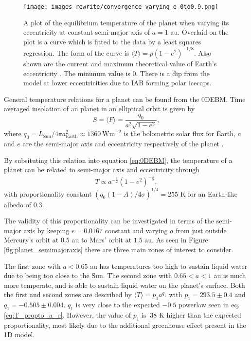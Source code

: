 \documentclass[12pt, onecolumn]{revtex4-2}    %
\begin{document}
\begin{figure}[t]
  \texttt{[image: images\_rewrite/convergence\_varying\_e\_0to0.9.png]}
  \caption{
    A plot of the equilibrium temperature of the planet when varying its eccentricity at constant semi-major axis of $a = 1$ au.
    Overlaid on the plot is a curve which is fitted to the data by a least squares regression.
    The form of the curve is $\langle T \rangle = p(1-e^2)^{-1/8}$.
    Also shown are the current and maximum theoretical value of Earth's eccentricity \cite{LA2010}.
    The minimum value is $0$.
    There is a dip from the model at lower eccentricities due to IAB forming polar icecaps.
  }
  \label{fig:planet_eccentricity}
\end{figure}

General temperature relations for a planet can be found from the 0DEBM.
Time averaged insolation of an planet in an elliptical orbit is given by
\begin{equation}
  S = \langle F \rangle = \frac{q_0}{a^2 \sqrt{1-e^2}},
  \label{eq:avgInsolation}
\end{equation}
where $q_0 = L_{\text{Sun}}/4\pi a_{\text{Earth}}^2 \approx 1360 \ \text{Wm}^{-2}$ is the bolometric solar flux for Earth, $a$ and $e$ are the semi-major axis and eccentricity respectively of the planet \cite{Mendez2017}.

By subsituting this relation into equation \eqref{eq:0DEBM}, the temperature of a planet can be related to semi-major axis and eccentricity through
\begin{equation}
  T \propto a^{-\frac{1}{2}} (1-e^2)^{-\frac{1}{8}}, 
  \label{eq:T_propto_a_e}
\end{equation}
with proportionality constant $(q_0 (1-A) / 4\sigma)^{1/4} = 255$ K for an Earth-like albedo of 0.3.


The validity of this proportionality can be investigated in terms of the semi-major axis by keeping $e = 0.0167$ constant and varying $a$ from just outside Mercury's orbit at $0.5$ au to Mars' orbit at $1.5$ au.
As seen in Figure \ref{fig:planet_semimajoraxis} there are three main zones of interest to consider.

The first zone with $a < 0.65$ au has temperatures too high to sustain liquid water due to being too close to the Sun.
The second zone with $0.65 < a < 1$ au is much more temperate, and is able to sustain liquid water on the planet's surface.
Both the first and second zones are described by $\langle T \rangle = p_1 a^{q_1}$ with $p_1 = 293.5 \pm 0.4$ and $q_1= -0.505 \pm 0.004$. $q_1$ is very close to the expected $-0.5$ powerlaw seen in eq. \eqref{eq:T_propto_a_e}.
However, the value of $p_1$ is $~38$ K higher than the expected proportionality, most likely due to the additional greenhouse effect present in the 1D model.
\end{document}
